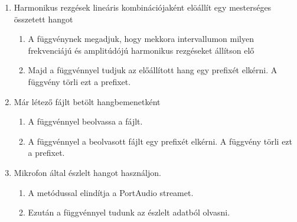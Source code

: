 \begin{enumerate}
	\item Harmonikus rezg\'esek line\'aris kombin\'aci\'ojak\'ent el\"o\'all\'it egy mesters\'eges \"osszetett hangot
		\begin{enumerate}
			\item A  f\"uggv\'enynek megadjuk, hogy mekkora intervallumon milyen frekvenci\'aj\'u \'es amplit\'ud\'oj\'u harmonikus rezg\'eseket \'all\'itson el\H o
			\item Majd a  f\"uggv\'ennyel tudjuk az el\H o\'all\'itott hang egy prefix\'et elk\'erni. A f\"uggv\'eny t\"orli ezt a prefixet.
		\end{enumerate}
	\item M\'ar l\'etez\H o  f\'ajlt bet\"olt hangbemenetk\'ent
		\begin{enumerate}
			\item A  f\"uggv\'ennyel beolvassa a f\'ajlt.
			\item A  f\"uggv\'ennyel a beolvasott f\'ajlt egy prefix\'et elk\'erni. A f\"uggv\'eny t\"orli ezt a prefixet.
		\end{enumerate}
	\item Mikrofon \'altal \'eszlelt hangot haszn\'aljon.
		\begin{enumerate}
			\item A  met\'odussal elind\'itja a PortAudio streamet.
			\item Ezut\'an a  f\"uggv\'ennyel tudunk az \'eszlelt adatb\'ol olvasni.
		\end{enumerate}
\end{enumerate} 


